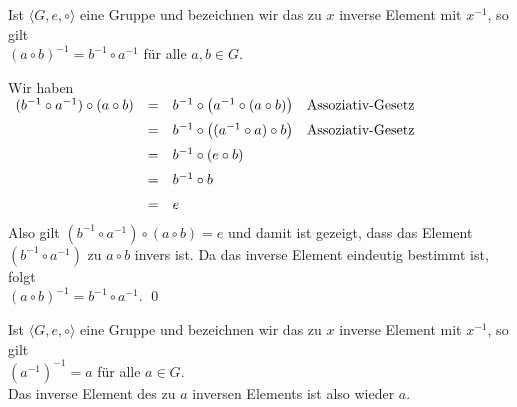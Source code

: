 \begin{Satz}[$(a \circ b)^{-1} = b^{-1} \circ a^{-1}$] \lb
  Ist $\langle G, e, \circ \rangle$ eine Gruppe und bezeichnen wir das zu $x$ inverse Element mit
  $x^{-1}$, so gilt
  \\[0.2cm]
  \hspace*{1.3cm}
  $(a \circ b)^{-1} = b^{-1} \circ a^{-1}$ \quad für alle $a,b \in G$.
\end{Satz}
\pagebreak

\proof
Wir haben
\\[0.2cm]
\hspace*{1.3cm}
$
\begin{array}[t]{lcll}
  (b^{-1} \circ a^{-1}) \circ (a \circ b) & = & b^{-1} \circ \bigl(a^{-1} \circ (a \circ b)\bigr) 
                                              & \mbox{Assoziativ-Gesetz} \\[0.2cm]
                                          & = & b^{-1} \circ \bigl((a^{-1} \circ a) \circ b\bigr) 
                                              & \mbox{Assoziativ-Gesetz} \\[0.2cm]
                                          & = & b^{-1} \circ (e \circ b) \\[0.2cm]
                                          & = & b^{-1} \circ b \\[0.2cm]
                                          & = & e \\[0.2cm]
\end{array}
$
\\[0.2cm]
Also gilt $(b^{-1} \circ a^{-1}) \circ (a \circ b) = e$ und damit ist gezeigt,  dass das Element
$(b^{-1} \circ a^{-1})$ zu $a \circ b$ invers ist.  Da das inverse Element eindeutig bestimmt ist, folgt
\\[0.2cm]
\hspace*{1.3cm}
$(a \circ b)^{-1} = b^{-1} \circ a^{-1}$. \qed


\begin{Satz}[$(a^{-1})^{-1} = a$]
  Ist $\langle G, e, \circ \rangle$ eine Gruppe und bezeichnen wir das zu $x$ inverse Element mit
  $x^{-1}$, so gilt
  \\[0.2cm]
  \hspace*{1.3cm}
  $(a^{-1})^{-1} = a$ \quad für alle $a \in G$.
  \\[0.2cm]
  Das inverse Element des zu $a$ inversen Elements ist also wieder $a$.
\end{Satz}

